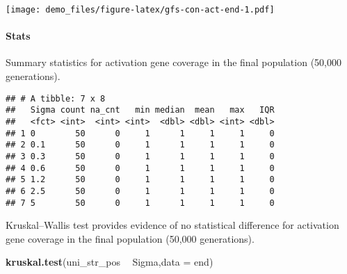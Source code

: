 \documentclass[]{book}
\newenvironment{Shaded}{\begin{snugshade}}{\end{snugshade}}
\newcommand{\DataTypeTok}[1]{\textcolor[rgb]{0.13,0.29,0.53}{#1}}
\newcommand{\KeywordTok}[1]{\textcolor[rgb]{0.13,0.29,0.53}{\textbf{#1}}}
\newcommand{\NormalTok}[1]{#1}
\newcommand{\OperatorTok}[1]{\textcolor[rgb]{0.81,0.36,0.00}{\textbf{#1}}}
\newcommand{\OtherTok}[1]{\textcolor[rgb]{0.56,0.35,0.01}{#1}}
\newcommand{\StringTok}[1]{\textcolor[rgb]{0.31,0.60,0.02}{#1}}
\let\oldparagraph\paragraph
\renewcommand{\paragraph}[1]{\oldparagraph{#1}\mbox{}}
\begin{document}
\texttt{[image: demo\_files/figure-latex/gfs-con-act-end-1.pdf]}

\hypertarget{stats-45}{%
\paragraph{Stats}\label{stats-45}}

Summary statistics for activation gene coverage in the final population (50,000 generations).

\begin{Shaded}
\end{Shaded}

\begin{verbatim}
## # A tibble: 7 x 8
##   Sigma count na_cnt   min median  mean   max   IQR
##   <fct> <int>  <int> <int>  <dbl> <dbl> <int> <dbl>
## 1 0        50      0     1      1     1     1     0
## 2 0.1      50      0     1      1     1     1     0
## 3 0.3      50      0     1      1     1     1     0
## 4 0.6      50      0     1      1     1     1     0
## 5 1.2      50      0     1      1     1     1     0
## 6 2.5      50      0     1      1     1     1     0
## 7 5        50      0     1      1     1     1     0
\end{verbatim}

Kruskal--Wallis test provides evidence of no statistical difference for activation gene coverage in the final population (50,000 generations).

\begin{Shaded}
\begin{Highlighting}[]
\KeywordTok{kruskal.test}\NormalTok{(uni_str_pos }\OperatorTok{~}\StringTok{ }\NormalTok{Sigma,}\DataTypeTok{data =}\NormalTok{ end)}
\end{Highlighting}
\end{Shaded}
\end{document}
